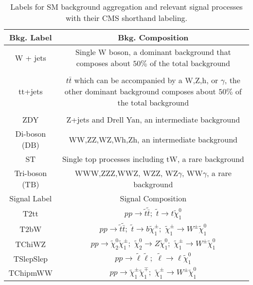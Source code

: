 \begin{table}
\caption{Labels for SM background aggregation and relevant signal processes with their CMS shorthand labeling.}
\begin{tabular}{c|c}
\hline 
Bkg. Label & Bkg. Composition \\ 
\hline 
\hline

W + jets & \makecell{Single W boson, a dominant background that composes \\ about $50\%$ of the total background} \\ 
  & \\
tt+jets & \makecell{$t\bar{t}$ which can be accompanied by a W,Z,h, or $\gamma$, \\ the other dominant background composes about $50\%$ of the total background} \\ 
  & \\
ZDY & Z+jets and Drell Yan, an intermediate background \\ 
Di-boson (DB)& WW,ZZ,WZ,Wh,Zh,  an intermediate background \\ 

ST & Single top processes including tW, a rare background \\ 

Tri-boson (TB) & WWW,ZZZ,WWZ, WZZ, WZ$\gamma$, WW$\gamma$, a rare background  \\ 
\hline 
Signal Label & Signal Composition \\
\hline
\hline
T2tt & $pp \rightarrow \tilde{t} \tilde{\bar{t}}; \, \, \tilde{t}\rightarrow t \tilde{\chi}_1^0$ \\
T2bW & $pp \rightarrow \tilde{t} \tilde{\bar{t}}; \, \, \tilde{t}\rightarrow b \tilde{\chi}_1^\pm; \, \, \tilde{\chi}_1^\pm \rightarrow W^\pm \tilde{\chi}^0_1$ \\
TChiWZ & $pp\rightarrow \tilde{\chi}_2^0 \tilde{\chi}_1^\pm; \, \, \tilde{\chi}_2^0 \rightarrow Z \tilde{\chi}^0_1; \, \, \tilde{\chi}_1^\pm \rightarrow W^\pm \tilde{\chi}^0_1$ \\
TSlepSlep & $pp\rightarrow \tilde{\ell} \tilde{\ell}; \, \, \tilde{\ell} \rightarrow \ell \tilde{\chi}^0_1$ \\
TChipmWW & $pp\rightarrow \tilde{\chi}_1^\pm \tilde{\chi}_1^\mp; \, \,  \tilde{\chi}_1^\pm \rightarrow W^\pm \tilde{\chi}^0_1$  \\
\end{tabular} \\
\label{tab:bkgsigtab}
\end{table}

